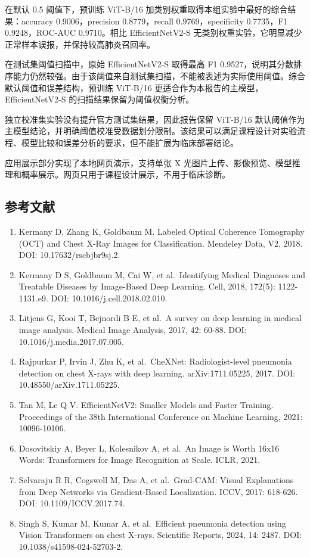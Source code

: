\documentclass[
]{ctexart}
\providecommand{\tightlist}{%
  \setlength{\itemsep}{0pt}\setlength{\parskip}{0pt}}
\begin{document}
在默认 0.5 阈值下，预训练 ViT-B/16
加类别权重取得本组实验中最好的综合结果：accuracy 0.9006，precision
0.8779，recall 0.9769，specificity 0.7735，F1 0.9248，ROC-AUC
0.9710。相比 EfficientNetV2-S
无类别权重实验，它明显减少正常样本误报，并保持较高肺炎召回率。

在测试集阈值扫描中，原始 EfficientNetV2-S 取得最高 F1
0.9527，说明其分数排序能力仍然较强。由于该阈值来自测试集扫描，不能被表述为实际使用阈值。综合默认阈值和误差结构，预训练
ViT-B/16 更适合作为本报告的主模型，EfficientNetV2-S
的扫描结果保留为阈值权衡分析。

独立校准集实验没有提升官方测试集结果，因此报告保留 ViT-B/16
默认阈值作为主模型结论，并明确阈值校准受数据划分限制。该结果可以满足课程设计对实验流程、模型比较和误差分析的要求，但不能扩展为临床部署结论。

应用展示部分实现了本地网页演示，支持单张 X
光图片上传、影像预览、模型推理和概率展示。网页只用于课程设计展示，不用于临床诊断。

\hypertarget{ux53c2ux8003ux6587ux732e}{%
\subsection{参考文献}\label{ux53c2ux8003ux6587ux732e}}

\begin{enumerate}
\def\labelenumi{\arabic{enumi}.}
\tightlist
\item
  Kermany D, Zhang K, Goldbaum M. Labeled Optical Coherence Tomography
  (OCT) and Chest X-Ray Images for Classification. Mendeley Data, V2,
  2018. DOI: 10.17632/rscbjbr9sj.2.
\item
  Kermany D S, Goldbaum M, Cai W, et al.~Identifying Medical Diagnoses
  and Treatable Diseases by Image-Based Deep Learning. Cell, 2018,
  172(5): 1122-1131.e9. DOI: 10.1016/j.cell.2018.02.010.
\item
  Litjens G, Kooi T, Bejnordi B E, et al.~A survey on deep learning in
  medical image analysis. Medical Image Analysis, 2017, 42: 60-88. DOI:
  10.1016/j.media.2017.07.005.
\item
  Rajpurkar P, Irvin J, Zhu K, et al.~CheXNet: Radiologist-level
  pneumonia detection on chest X-rays with deep learning.
  arXiv:1711.05225, 2017. DOI: 10.48550/arXiv.1711.05225.
\item
  Tan M, Le Q V. EfficientNetV2: Smaller Models and Faster Training.
  Proceedings of the 38th International Conference on Machine Learning,
  2021: 10096-10106.
\item
  Dosovitskiy A, Beyer L, Kolesnikov A, et al.~An Image is Worth 16x16
  Words: Transformers for Image Recognition at Scale. ICLR, 2021.
\item
  Selvaraju R R, Cogswell M, Das A, et al.~Grad-CAM: Visual Explanations
  from Deep Networks via Gradient-Based Localization. ICCV, 2017:
  618-626. DOI: 10.1109/ICCV.2017.74.
\item
  Singh S, Kumar M, Kumar A, et al.~Efficient pneumonia detection using
  Vision Transformers on chest X-rays. Scientific Reports, 2024, 14:
  2487. DOI: 10.1038/s41598-024-52703-2.
\end{enumerate}
\end{document}
